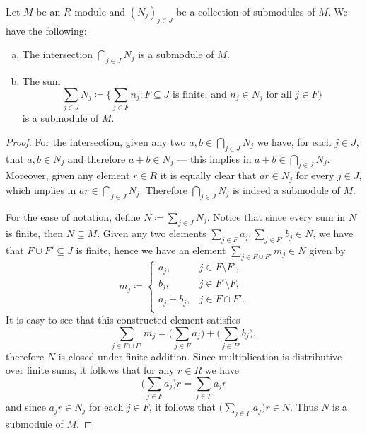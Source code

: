 \begin{example}
\label{exp:intersection-sum-submodules}
Let \(M\) be an \(R\)-module and \((N_j)_{j \in J}\) be a collection of
submodules of \(M\). We have the following:
\begin{enumerate}[(a)]\setlength\itemsep{0em}
\item The intersection \(\bigcap_{j \in J} N_j\) is a submodule of \(M\).
\item The sum
  \[
  \sum_{j \in J} N_j \coloneq \bigg\{
  \sum_{j \in F} n_j \colon F \subseteq J
  \text{ is finite, and } n_j \in N_j \text{ for all } j \in F
  \bigg\}
  \]
  is a submodule of \(M\).
\end{enumerate}
\begin{proof}
For the intersection, given any two \(a, b \in \bigcap_{j \in J} N_j\) we have,
for each \(j \in J\), that \(a, b \in N_j\) and therefore \(a + b \in N_j\) ---
this implies in \(a + b \in \bigcap_{j \in J} N_j\). Moreover, given any element
\(r \in R\) it is equally clear that \(a r \in N_j\) for every \(j \in J\),
which implies in \(a r \in \bigcap_{j \in J} N_j\). Therefore
\(\bigcap_{j \in J} N_j\) is indeed a submodule of \(M\).

For the ease of notation, define \(N \coloneq \sum_{j \in J} N_j\). Notice that
since every sum in \(N\) is finite, then \(N \subseteq M\). Given any two
elements \(\sum_{j \in F} a_j, \sum_{j \in F'} b_j \in N\), we have that
\(F \cup F' \subseteq J\) is finite, hence we have an element
\(\sum_{j \in F \cup F'} m_j \in N\) given by
\[
m_j \coloneq
\begin{cases}
  a_j,  &j \in F \setminus F', \\
  b_j, &j \in F' \setminus F, \\
  a_j + b_j, &j \in F \cap F'. \\
\end{cases}
\]
It is easy to see that this constructed element satisfies
\[
\sum_{j \in F \cup F'} m_j =
\bigg( \sum_{j \in F} a_j \bigg) +
\bigg( \sum_{j \in F'} b_j \bigg),
\]
therefore \(N\) is closed under finite addition. Since multiplication is
distributive over finite sums, it follows that for any \(r \in R\) we have
\[
\bigg( \sum_{j \in F} a_j \bigg) r = \sum_{j \in F} a_j r
\]
and since \(a_j r \in N_j\) for each \(j \in F\), it follows that
\(\big( \sum_{j \in F} a_j \big) r \in N\). Thus \(N\) is a submodule of
\(M\).
\end{proof}
\end{example}

